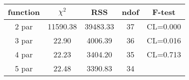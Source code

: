 \begin{tabular}{c|c|c|c|c}
function & $\chi^2$ & RSS & ndof & F-test \\
\hline
2 par & 11590.38 & 39483.33 & 37 & CL=0.000 \\
3 par & 22.90 & 4006.39 & 36 & CL=0.016 \\
4 par & 22.23 & 3404.20 & 35 & CL=0.713 \\
5 par & 22.48 & 3390.83 & 34 & \\
\hline
\end{tabular}